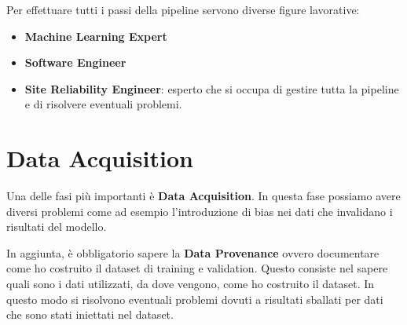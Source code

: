 Per effettuare tutti i passi della pipeline servono diverse figure lavorative:
\begin{itemize}
    \item \textbf{Machine Learning Expert}
    \item \textbf{Software Engineer}
    \item \textbf{Site Reliability Engineer}: esperto che si occupa di gestire
          tutta la pipeline e di risolvere eventuali problemi.
\end{itemize}
\section{Data Acquisition}
Una delle fasi più importanti è \textbf{Data Acquisition}. In questa fase possiamo
avere diversi problemi come ad esempio l'introduzione di bias nei dati che
invalidano i risultati del modello.

In aggiunta, è obbligatorio sapere la \textbf{Data Provenance} ovvero documentare
come ho costruito il dataset di training e validation. Questo consiste nel sapere
quali sono i dati utilizzati, da dove vengono, come ho costruito il dataset. In
questo modo si risolvono eventuali problemi dovuti a risultati sballati per dati
che sono stati iniettati nel dataset.